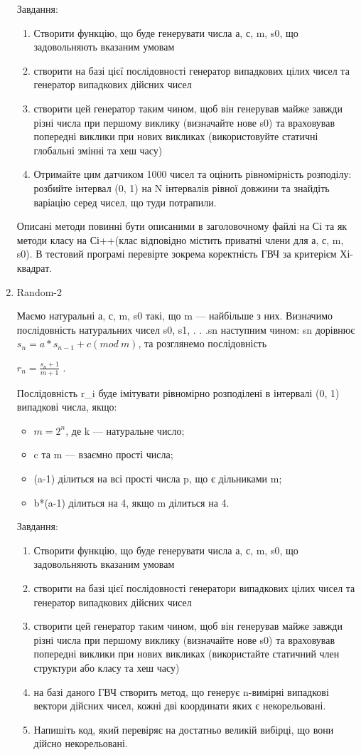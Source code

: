 \documentclass[]{article}
\makeatletter
\newcommand{\xslalph}[1]{\expandafter\@xslalph\csname c@#1\endcsname}
\newcommand{\@xslalph}[1]{%
    \ifcase#1\or а\or б\or в\or г\or д\or e\or є\or ж\or з\or i%
    \or й\or к\or л\or м\or н\or о\or п\or р\or с\or т%
    \or у\or ф\or х\or ц\or ч\or ш\or ю\or я\or аа\or бб\or вв %
    \else\@ctrerr\fi%
}
\makeatother
\begin{document}
\begin{enumerate}
Завдання:
 \begin{enumerate}[label=\xslalph*)]
 \item 
 Створити функцію, що буде генерувати числа а, с, m, s0, що
задовольняють вказаним умовам
 \item 
 створити на базі цієї послідовності генератор випадкових цілих чисел
та генератор випадкових дійсних чисел
\item
 створити цей генератор таким чином, щоб він генерував майже завжди
різні числа при першому виклику (визначайте нове s0) та враховував
попередні виклики при нових викликах (використовуйте статичні глобальні
змінні та хеш часу)
\item Отримайте цим датчиком 1000 чисел та оцінить рівномірність розподілу:
розбийте інтервал (0, 1) на N інтервалів рівної довжини та знайдіть
варіацію серед чисел, що туди потрапили.
\end{enumerate}
Описані методи повинні бути описаними в заголовочному файлі на Сі та як
методи класу на Сі++(клас відповідно містить приватні члени для а, с, m,
s0). В тестовий програмі перевірте зокрема коректність ГВЧ за критерієм
Хі-квадрат.

\item
Random-2

Маємо натуральні а, с, m, s0 такі, що m --- найбільше з них. Визначимо
послідовність натуральних чисел s0, s1, . . .sn наступним чином: sn
дорівнює \(s_{n} = a*s_{n - 1} + c(mod\ m)\), та розглянемо
послідовність

\(r_{n} = \frac{s_{n} + 1}{m + 1}\) .

Послідовність r\_i буде імітувати рівномірно розподілені в інтервалі (0,
1) випадкові числа, якщо:

\begin{itemize}
\item
\({m = 2}^{n}\), де k --- натуральне число;
\item
c та m --- взаємно прості числа;
\item
(a-1) ділиться на всі прості числа p, що є дільниками m;
\item
b*(a-1) ділиться на 4, якщо m ділиться на 4.
\end{itemize}
Завдання:
 \begin{enumerate}[label=\xslalph*)]
 \item 
 Створити функцію, що буде генерувати числа а, с, m, s0, що
задовольняють вказаним умовам
\item
 створити на базі цієї послідовності генератори випадкових цілих чисел
та генератор випадкових дійсних чисел
\item
 створити цей генератор таким чином, щоб він генерував майже завжди
різні числа при першому виклику (визначайте нове s0) та враховував
попередні виклики при нових викликах (використайте статичний член
структури або класу та хеш часу)
\item
 на базі даного ГВЧ створить метод, що генерує n-вимірні випадкові
вектори дійсних чисел, кожні дві координати яких є некорельовані.
\item
Напишіть код, який перевіряє на достатньо великій вибірці, що вони
дійсно некорельовані.
\end{enumerate}


\end{enumerate}
\end{document}
